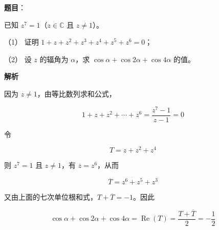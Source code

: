 \begin{answer}

\textbf{题目}：

已知 $z^7=1$（$z\in\mathbb C$ 且 $z\ne1$）。

（1） 证明 $1+z+z^2+z^3+z^4+z^5+z^6=0$；

（2） 设 $z$ 的辐角为 $\alpha$，求 $\cos\alpha+\cos2\alpha+\cos4\alpha$ 的值。

\textbf{解析}


因为 $z\ne1$，由等比数列求和公式，

\nopagebreak[4]
\[
1+z+z^2+\cdots+z^6=\frac{z^7-1}{z-1}=0
\]


令

\nopagebreak[4]
\[
T=z+z^2+z^4
\]

则 $z^7=1$ 且 $z\ne1$，有 $\overline z=z^6$，从而

\nopagebreak[4]
\[
\overline T=z^6+z^5+z^3
\]

又由上面的七次单位根和式，$T+\overline T=-1$。因此

\nopagebreak[4]
\[
\cos\alpha+\cos2\alpha+\cos4\alpha
=\operatorname{Re}(T)
=\frac{T+\overline T}{2}
=-\frac12
\]



\end{answer}
